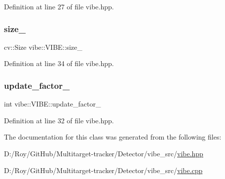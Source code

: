 Definition at line 27 of file vibe.\+hpp.

\mbox{\label{classvibe_1_1_v_i_b_e_a4748d53eff7e5a96ad4f98206dc7bb2c}} 
\subsubsection{\texorpdfstring{size\+\_\+}{size\_}}
{\footnotesize\ttfamily cv\+::\+Size vibe\+::\+V\+I\+B\+E\+::size\+\_\+\hspace{0.3cm}{\ttfamily [private]}}



Definition at line 34 of file vibe.\+hpp.

\mbox{\label{classvibe_1_1_v_i_b_e_a3abaee256b69fec3b0b49805a0e92e0c}} 
\subsubsection{\texorpdfstring{update\+\_\+factor\+\_\+}{update\_factor\_}}
{\footnotesize\ttfamily int vibe\+::\+V\+I\+B\+E\+::update\+\_\+factor\+\_\+\hspace{0.3cm}{\ttfamily [private]}}



Definition at line 32 of file vibe.\+hpp.



The documentation for this class was generated from the following files\+:\begin{DoxyCompactItemize}
\item 
D\+:/\+Roy/\+Git\+Hub/\+Multitarget-\/tracker/\+Detector/vibe\+\_\+src/\mbox{\hyperlink{vibe_8hpp}{vibe.\+hpp}}\item 
D\+:/\+Roy/\+Git\+Hub/\+Multitarget-\/tracker/\+Detector/vibe\+\_\+src/\mbox{\hyperlink{vibe_8cpp}{vibe.\+cpp}}\end{DoxyCompactItemize}
